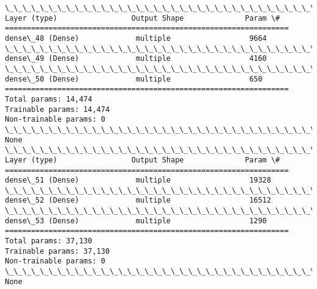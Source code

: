 \documentclass[11pt]{article}
\begin{document}
    \begin{Verbatim}[commandchars=\\\{\}]
\_\_\_\_\_\_\_\_\_\_\_\_\_\_\_\_\_\_\_\_\_\_\_\_\_\_\_\_\_\_\_\_\_\_\_\_\_\_\_\_\_\_\_\_\_\_\_\_\_\_\_\_\_\_\_\_\_\_\_\_\_\_\_\_\_
Layer (type)                 Output Shape              Param \#   
=================================================================
dense\_48 (Dense)             multiple                  9664      
\_\_\_\_\_\_\_\_\_\_\_\_\_\_\_\_\_\_\_\_\_\_\_\_\_\_\_\_\_\_\_\_\_\_\_\_\_\_\_\_\_\_\_\_\_\_\_\_\_\_\_\_\_\_\_\_\_\_\_\_\_\_\_\_\_
dense\_49 (Dense)             multiple                  4160      
\_\_\_\_\_\_\_\_\_\_\_\_\_\_\_\_\_\_\_\_\_\_\_\_\_\_\_\_\_\_\_\_\_\_\_\_\_\_\_\_\_\_\_\_\_\_\_\_\_\_\_\_\_\_\_\_\_\_\_\_\_\_\_\_\_
dense\_50 (Dense)             multiple                  650       
=================================================================
Total params: 14,474
Trainable params: 14,474
Non-trainable params: 0
\_\_\_\_\_\_\_\_\_\_\_\_\_\_\_\_\_\_\_\_\_\_\_\_\_\_\_\_\_\_\_\_\_\_\_\_\_\_\_\_\_\_\_\_\_\_\_\_\_\_\_\_\_\_\_\_\_\_\_\_\_\_\_\_\_
None
\_\_\_\_\_\_\_\_\_\_\_\_\_\_\_\_\_\_\_\_\_\_\_\_\_\_\_\_\_\_\_\_\_\_\_\_\_\_\_\_\_\_\_\_\_\_\_\_\_\_\_\_\_\_\_\_\_\_\_\_\_\_\_\_\_
Layer (type)                 Output Shape              Param \#   
=================================================================
dense\_51 (Dense)             multiple                  19328     
\_\_\_\_\_\_\_\_\_\_\_\_\_\_\_\_\_\_\_\_\_\_\_\_\_\_\_\_\_\_\_\_\_\_\_\_\_\_\_\_\_\_\_\_\_\_\_\_\_\_\_\_\_\_\_\_\_\_\_\_\_\_\_\_\_
dense\_52 (Dense)             multiple                  16512     
\_\_\_\_\_\_\_\_\_\_\_\_\_\_\_\_\_\_\_\_\_\_\_\_\_\_\_\_\_\_\_\_\_\_\_\_\_\_\_\_\_\_\_\_\_\_\_\_\_\_\_\_\_\_\_\_\_\_\_\_\_\_\_\_\_
dense\_53 (Dense)             multiple                  1290      
=================================================================
Total params: 37,130
Trainable params: 37,130
Non-trainable params: 0
\_\_\_\_\_\_\_\_\_\_\_\_\_\_\_\_\_\_\_\_\_\_\_\_\_\_\_\_\_\_\_\_\_\_\_\_\_\_\_\_\_\_\_\_\_\_\_\_\_\_\_\_\_\_\_\_\_\_\_\_\_\_\_\_\_
None

    \end{Verbatim}
\end{document}

